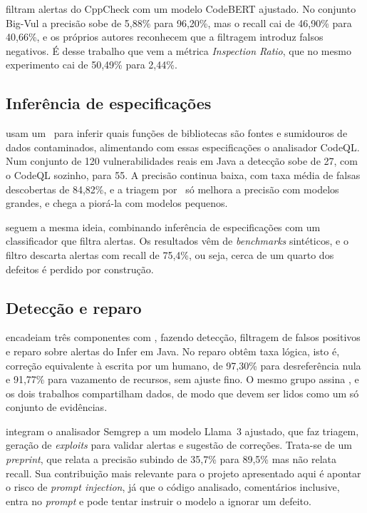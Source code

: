 filtram alertas do CppCheck com um modelo CodeBERT
ajustado. No conjunto Big-Vul a precisão sobe de 5,88\% para 96,20\%, mas o
recall cai de 46,90\% para 40,66\%, e os próprios autores reconhecem que a
filtragem introduz falsos negativos. É desse trabalho que vem a métrica
\textit{Inspection Ratio}, que no mesmo experimento cai de 50,49\% para 2,44\%.

\subsection{Inferência de especificações}

 usam um \llm\ para inferir quais funções de bibliotecas são
fontes e sumidouros de dados contaminados, alimentando com essas
especificações o analisador CodeQL. Num conjunto de 120 vulnerabilidades reais
em Java a detecção sobe de 27, com o CodeQL sozinho, para 55. A precisão
continua baixa, com taxa média de falsas descobertas de 84,82\%, e a triagem
por \llm\ só melhora a precisão com modelos grandes, e chega a piorá-la com modelos
pequenos.

 seguem a mesma ideia, combinando inferência de
especificações com um classificador que filtra alertas. Os resultados vêm de
\textit{benchmarks} sintéticos, e o filtro descarta alertas com recall de
75,4\%, ou seja, cerca de um quarto dos defeitos é perdido por construção.

\subsection{Detecção e reparo}

 encadeiam três componentes com \llm, fazendo
detecção, filtragem de falsos positivos e reparo sobre alertas do Infer em
Java. No reparo obtêm taxa lógica, isto é, correção equivalente à escrita por
um humano, de 97,30\% para desreferência nula e 91,77\% para vazamento de
recursos, sem ajuste fino. O mesmo grupo assina , e
os dois trabalhos compartilham dados, de modo que devem ser lidos como um só
conjunto de evidências.

 integram o analisador Semgrep a um modelo Llama~3
ajustado, que faz triagem, geração de \textit{exploits} para validar alertas e
sugestão de correções. Trata-se de um \textit{preprint}, que relata a precisão
subindo de 35,7\% para 89,5\% mas não relata recall. Sua contribuição mais
relevante para o projeto apresentado aqui é apontar o risco de
\textit{prompt injection}, já que o código analisado, comentários inclusive,
entra no \textit{prompt} e pode tentar instruir o modelo a ignorar um defeito.

